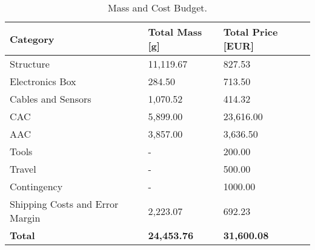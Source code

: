 
\begin{table}[H]
\centering
\begin{tabular}{|m{3.5cm}|m{3.5cm}|m{3.5cm}|}
\hline

\textbf{Category} & \textbf{Total Mass [g]} & \textbf{Total Price [EUR]} \\ \hline
Structure & 11,119.67 & 827.53 \\ \hline
Electronics Box & 284.50 & 713.50 \\ \hline
Cables and Sensors & 1,070.52 & 414.32 \\ \hline
CAC & 5,899.00 & 23,616.00 \\ \hline
AAC & 3,857.00 & 3,636.50 \\ \hline
Tools & - & 200.00 \\ \hline
Travel & - & 500.00 \\ \hline
Contingency & - & 1000.00 \\ \hline
Shipping Costs and Error Margin & 2,223.07 & 692.23 \\ \hline
{\textbf{Total}} & \textbf{24,453.76} & \textbf{31,600.08} \\ \hline
\end{tabular}
\caption{Mass and Cost Budget.}
\label{table:mass-and-cost-budget}
\end{table}

\raggedbottom